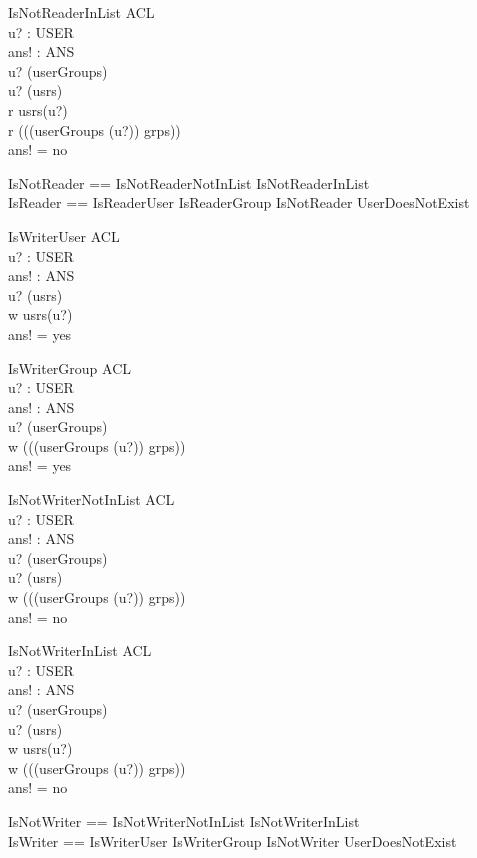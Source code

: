 \begin{schema}{IsNotReaderInList} 
\Xi ACL \\
u? : USER \\
ans! : ANS \\
\where 
u? \in \dom (userGroups) \\ 
u? \in \dom (usrs) \\
r \notin usrs(u?) \\
r \notin \bigcup (\ran((userGroups (u?)) \dres grps)) \\
ans! = no
\end{schema}

\begin{zed}
IsNotReader == IsNotReaderNotInList \lor IsNotReaderInList\\

IsReader == IsReaderUser \lor IsReaderGroup \lor IsNotReader \lor UserDoesNotExist
\end{zed}

\begin{schema}{IsWriterUser}
\Xi ACL \\
u? : USER \\
ans! : ANS \\
\where
u? \in \dom (usrs) \\ 
w \in usrs(u?) \\
ans! = yes
\end{schema}

\begin{schema}{IsWriterGroup}
\Xi ACL \\
u? : USER \\
ans! : ANS \\
\where
u? \in \dom (userGroups) \\ 
w \in \bigcup (\ran((userGroups (u?)) \dres grps)) \\
ans! = yes
\end{schema}

\begin{schema}{IsNotWriterNotInList} 
\Xi ACL \\
u? : USER \\
ans! : ANS \\
\where 
u? \in \dom (userGroups) \\ 
u? \notin \dom (usrs) \\
w \notin \bigcup (\ran((userGroups (u?)) \dres grps)) \\
ans! = no
\end{schema}

\begin{schema}{IsNotWriterInList} 
\Xi ACL \\
u? : USER \\
ans! : ANS \\
\where 
u? \in \dom (userGroups) \\ 
u? \in \dom (usrs) \\
w \notin usrs(u?) \\
w \notin \bigcup (\ran((userGroups (u?)) \dres grps)) \\
ans! = no
\end{schema}

\begin{zed}
IsNotWriter == IsNotWriterNotInList \lor IsNotWriterInList\\

IsWriter == IsWriterUser \lor IsWriterGroup \lor IsNotWriter \lor UserDoesNotExist
\end{zed}